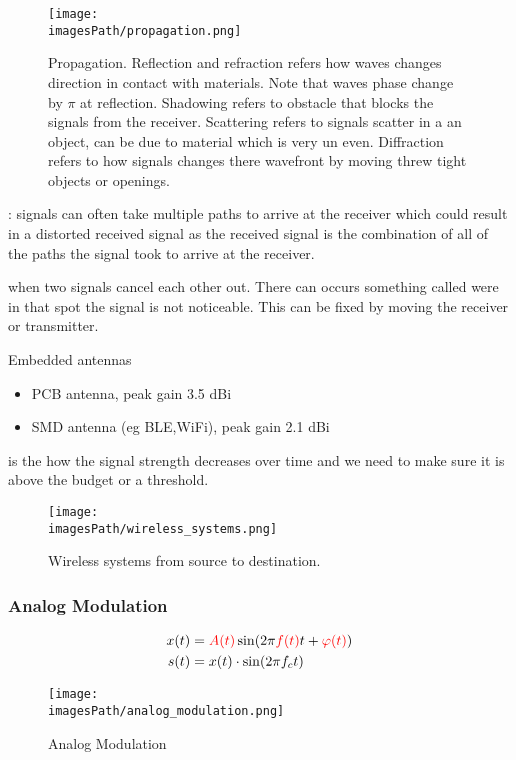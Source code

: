 \begin{figure}[H]
    \centering
    \texttt{[image: \\imagesPath/propagation.png]}
    \caption{Propagation. Reflection and refraction refers how waves changes direction in contact with materials. Note that waves phase change by $\pi$ at reflection.
    Shadowing refers to obstacle that blocks the signals from the receiver.
    Scattering refers to signals scatter in a an object, can be due to material which is very un even.
    Diffraction refers to how signals changes there wavefront by moving threw tight objects or openings.}
\end{figure}

: signals can often take multiple paths to arrive at the receiver which could result in a distorted received signal 
as the received signal is the combination of all of the paths the signal took to arrive at the receiver.

 when two signals cancel each other out. There can occurs something called  
were in that spot the signal is not noticeable. This can be fixed by moving the receiver or transmitter.

Embedded antennas
\begin{itemize}
    \item PCB antenna, peak gain 3.5 dBi
    \item SMD antenna (eg BLE,WiFi), peak gain 2.1 dBi
\end{itemize}

 is the how the signal strength decreases over time and we need to make sure 
it is above the budget or a threshold.

\begin{figure}[H]
    \centering
    \texttt{[image: \\imagesPath/wireless\_systems.png]}
    \caption{Wireless systems from source to destination.}
\end{figure}


\subsubsection{Analog Modulation}
\begin{align}
    x(t) &= \textcolor{red}{A(t)}\sin(2\pi \textcolor{red}{f(t)}t + \textcolor{red}{\varphi(t)}) \\
    s(t) &= x(t)\cdot\sin(2\pi f_c t)
\end{align}

\begin{figure}[H]
    \centering
    \texttt{[image: \\imagesPath/analog\_modulation.png]}
    \caption{Analog Modulation}
\end{figure}

